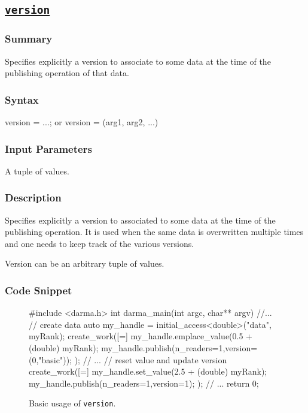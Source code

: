 \clearpage
\subsection{\underline{\texttt{version}}}
\label{ssec:api_fe_version}

\hspace{0.1cm} %
\begin{subs}
\vspace{-1.2cm}

\subsubsection{Summary} 
Specifies explicitly a version to associate to some data 
at the time of the publishing operation of that data.  


\subsubsection{Syntax} 
\begin{CppCode}
version = ...;    or    version = (arg1, arg2, ...)
\end{CppCode}


\subsubsection{Input Parameters} 
A tuple of values.


\subsubsection{Description} 
Specifies explicitly a version to associated to some data 
at the time of the publishing operation.  
It is used when the same data is overwritten multiple times 
and one needs to keep track of the various versions.

Version can be an arbitrary tuple of values.

\subsubsection{Code Snippet} 
\begin{figure}[!h]
\begin{CppCodeNumb}
#include <darma.h>
int darma_main(int argc, char** argv)
{
	//...
  // create data
  auto my_handle = initial_access<double>("data", myRank);
  create_work([=]{
    my_handle.emplace_value(0.5 + (double) myRank);
    my_handle.publish(n_readers=1,version=(0,"basic"));
  });
  // ...
  // reset value and update version
  create_work([=]{
    my_handle.set_value(2.5 + (double) myRank);
    my_handle.publish(n_readers=1,version=1);
  });
  // ... 
  return 0;
}
\end{CppCodeNumb}
\label{fig:fe_api_initialaccess}
\caption{Basic usage of \texttt{version}.}
\end{figure}

\end{subs}


